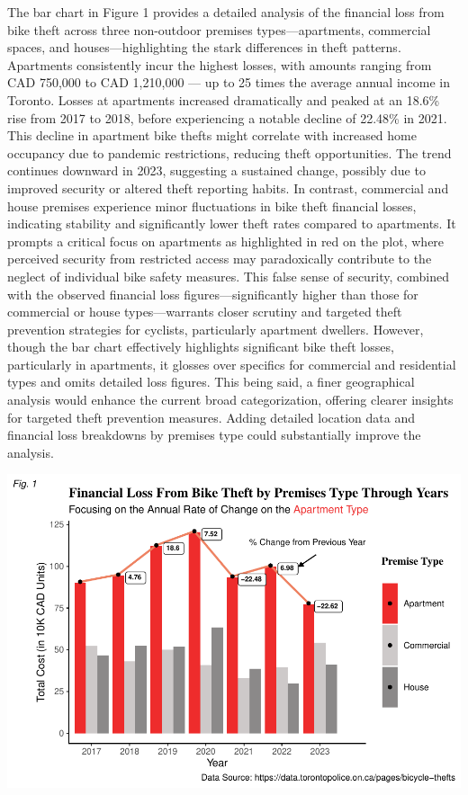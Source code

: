 \documentclass[
  11pt,
]{article}
\begin{document}
\indent The bar chart in Figure 1 provides a detailed analysis of the
financial loss from bike theft across three non-outdoor premises
types---apartments, commercial spaces, and houses---highlighting the
stark differences in theft patterns. Apartments consistently incur the
highest losses, with amounts ranging from CAD 750,000 to CAD 1,210,000
--- up to 25 times the average annual income in Toronto. Losses at
apartments increased dramatically and peaked at an 18.6\% rise from 2017
to 2018, before experiencing a notable decline of 22.48\% in 2021. This
decline in apartment bike thefts might correlate with increased home
occupancy due to pandemic restrictions, reducing theft opportunities.
The trend continues downward in 2023, suggesting a sustained change,
possibly due to improved security or altered theft reporting habits. In
contrast, commercial and house premises experience minor fluctuations in
bike theft financial losses, indicating stability and significantly
lower theft rates compared to apartments. It prompts a critical focus on
apartments as highlighted in red on the plot, where perceived security
from restricted access may paradoxically contribute to the neglect of
individual bike safety measures. This false sense of security, combined
with the observed financial loss figures---significantly higher than
those for commercial or house types---warrants closer scrutiny and
targeted theft prevention strategies for cyclists, particularly
apartment dwellers. However, though the bar chart effectively highlights
significant bike theft losses, particularly in apartments, it glosses
over specifics for commercial and residential types and omits detailed
loss figures. This being said, a finer geographical analysis would
enhance the current broad categorization, offering clearer insights for
targeted theft prevention measures. Adding detailed location data and
financial loss breakdowns by premises type could substantially improve
the analysis.

\begin{center}\includegraphics{Bike_Theft_files/figure-latex/unnamed-chunk-5-1} \end{center}
\end{document}
